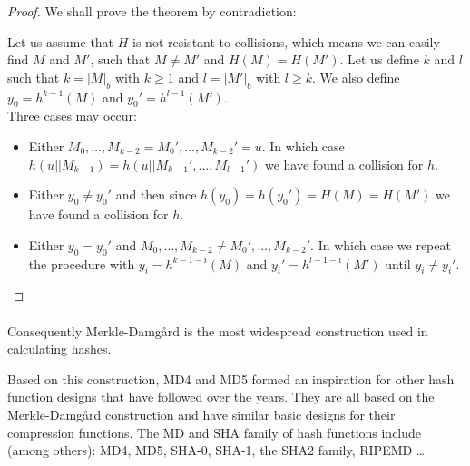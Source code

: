 \begin{proof}
  We shall prove the theorem by contradiction:

  Let us assume that $H$ is not resistant to collisions, which means we can easily find $M$ and $M'$, such that $M \ne M'$ and $H(M)=H(M')$.
  Let us define $k$ and $l$ such that $k=\vert M\vert_b$ with $k \ge 1$ and $l=\vert M'\vert_b$ with $l \ge k$.
  We also define $y_0 = h^{k-1}(M)$ and $y_0' = h^{l-1}(M')$.\\
  Three cases may occur:
\begin{itemize}
\item Either $M_0,\ldots,M_{k-2}=M_0',\ldots,M_{k-2}'= u $. In which case $h(u \vert \vert M_{k-1})=h(u \vert \vert M_{k-1}',\ldots,M_{l-1}')$ we have found a collision for $h$.
\item Either $y_0 \ne y_0'$ and then since $h(y_0)=h(y_0')=H(M)=H(M')$ we have found a collision for $h$.
\item Either $y_0 = y_0'$ and $M_0,\ldots,M_{k-2} \ne M_0',\ldots,M_{k-2}'$. In which case we repeat the procedure with $y_i = h^{k-1-i}(M)$ and $y_i' = h^{l-1-i}(M')$ until $y_i \ne y_i'$.
\end{itemize}
\end{proof}


\paragraph{}

Consequently Merkle-Damg\r{a}rd is the most widespread construction used in calculating hashes.

Based on this construction, MD4 and MD5 formed an inspiration for other hash function designs that have followed over the years. They are all based on the Merkle-Damg\r{a}rd construction and have similar basic designs for their compression functions. The MD and SHA family of hash functions include (among others): MD4, MD5, SHA-0, SHA-1, the SHA2 family, RIPEMD \ldots




